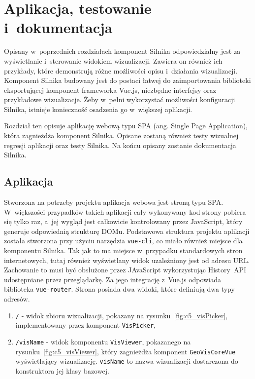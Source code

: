\chapter{Aplikacja, testowanie i~dokumentacja}

Opisany w~poprzednich rozdziałach komponent Silnika odpowiedzialny jest za wyświetlanie i~sterowanie widokiem wizualizacji. Zawiera on również ich przykłady, które demonstrują różne możliwości opisu i~działania wizualizacji. Komponent Silnika budowany jest do postaci łatwej do zaimportowania biblioteki eksportującej komponent frameworka Vue.js, niezbędne interfejsy oraz przykładowe wizualizacje. Żeby w~pełni wykorzystać możliwości konfiguracji Silnika, istnieje konieczność osadzenia go w~większej aplikacji.

Rozdział ten opisuje aplikację webową typu SPA (ang. Single Page Application), która zagnieżdża komponent Silnika. Opisane zostaną również testy wizualnej regresji aplikacji oraz testy Silnika. Na końcu opisany zostanie dokumentacja Silnika.

\section{Aplikacja}
Stworzona na potrzeby projektu aplikacja webowa jest stroną typu SPA. W~większości przypadków takich aplikacji cały wykonywany kod strony pobiera się tylko raz, a~jej wygląd jest całkowicie kontrolowany przez JavaScript, który generuje odpowiednią strukturę DOMu. Podstawowa struktura projektu aplikacji została stworzona przy użyciu narzędzia \texttt{vue-cli}, co miało również miejsce dla komponentu Silnika. Tak jak to ma miejsce w~przypadku standardowych stron internetowych, tutaj również wyświetlany widok uzależniony jest od adresu URL. Zachowanie to musi być obsłużone przez JAvaScript wykorzystując History~API ~\cite{HistoryAPI} udostępniane przez przeglądarkę. Za jego integrację z~Vue.js odpowiada biblioteka \texttt{vue-router}. Strona posiada dwa widoki, które definiują dwa typy adresów.

\begin{enumerate}
    \item \texttt{/} - widok zbioru wizualizacji, pokazany na rysunku~\ref{fig:c5_visPicker}, implementowany przez komponent \texttt{VisPicker},
    \item \texttt{/visName} - widok komponentu \texttt{VisViewer}, pokazanego na rysunku~\ref{fig:c5_visViewer}, który zagnieżdża komponent \texttt{GeoVisCoreVue} wyświetlający wizualizację. \texttt{visName} to nazwa wizualizacji dostarczona do konstruktora jej klasy bazowej.
\end{enumerate}

